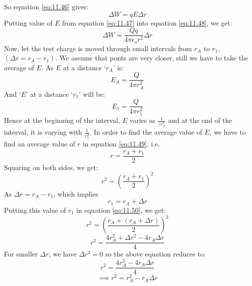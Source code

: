 So equation \ref{eq:11.46} gives:
\begin{equation}\label{eq:11.48}
  \Delta W = qE\Delta r
\end{equation}
Putting value of $E$ from equation \ref{eq:11.47} into equation \ref{eq:11.48},
we get:
\begin{equation}\label{eq:11.49}
  \Delta W = \frac{Qq}{4\pi\epsilon_{o} r^{2}} \Delta r
\end{equation}
Now, let the test charge is moved through small intervals from $r_{A}$
to $r_{1}$, $(\Delta r = r_{A} - r_{1})$. We assume that ponts are very closer,
still we have to take the average of $E$. As $E$ at a distance `$r_{A}$' is:
\begin{equation}
  E_{A} = \frac{Q}{4\pi r_{A}^{2}} \nonumber
\end{equation}
And `$E$' at a distance `$r_{1}$' will be:
\begin{equation}
  E_{1} = \frac{Q}{4\pi r_{1}^{2}} \nonumber
\end{equation}
Hence at the beginning of the interval, $E$ varies as $\frac{1}{/r_{A}^{2}}$ and at the end
of the interval, it is varying with $\frac{1}{r_{1}^{2}}$. In order to find the average
value of $E$, we have to find an average value of $r$ in equation \ref{eq:11.49}. i.e.
\begin{equation}
  r = \frac{r_{A}+r_{1}}{2} \nonumber
\end{equation}
Squaring on both sides, we get:
\begin{equation}\label{eq:11.50}
  r^{2} = (\frac{r_{A}+r_{1}}{2})^{2} 
\end{equation}
As $\Delta r = r_{A} - r_{1}$, which implies 
\begin{equation}
  r_{1} = r_{A} + \Delta r \nonumber
\end{equation}
Putting this value of $r_{1}$ in equation \ref{eq:11.50}, we get:
\begin{equation}
  r^{2} = (\frac{r_{A}+(r_{A} + \Delta r)}{2})^{2} \nonumber
\end{equation}
\begin{equation}
  r^{2} = \frac{4r_{A}^{2} + \Delta r^2 -4r_{A}\Delta r}{4} \nonumber
\end{equation}
For smaller $\Delta r$, we have $\Delta r^{2} = 0$ so the above equation reduces
to:
\begin{equation}
  r^{2} = \frac{4r_{A}^{2} - 4r_{A}\Delta r}{4} \nonumber
\end{equation}
\begin{equation}\label{eq:11.51}
\implies r^{2} = r_{A}^{2} - r_{A}\Delta r 
\end{equation}

